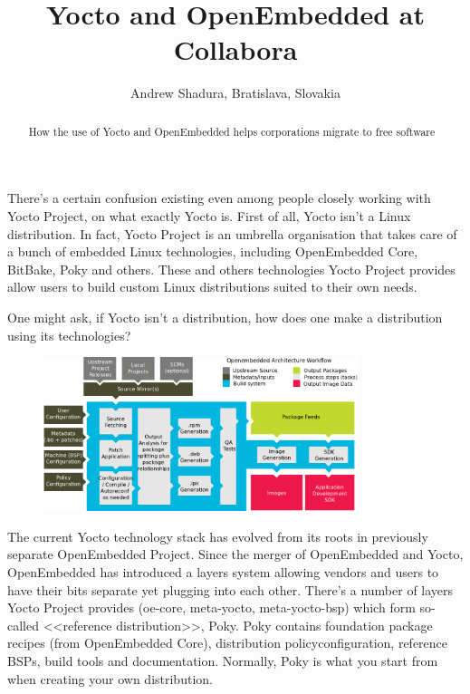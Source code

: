 \documentclass[10pt, a5paper]{article}
\begin{document}
\title{Yocto and OpenEmbedded at Collabora}
\author{Andrew Shadura, Bratislava, Slovakia}
\maketitle
\begin{abstract}
How the use of Yocto and OpenEmbedded helps corporations migrate to free software
\end{abstract}

There's a certain confusion existing even among people closely \linebreak working with Yocto Project, on what exactly Yocto is. First of all, Yocto isn't a Linux distribution. In fact, Yocto Project is an umbrella organisation that takes care of a bunch of embedded Linux technologies, including OpenEmbedded Core, BitBake, Poky and others. These and others technologies Yocto Project provides allow users to build custom Linux distributions suited to their own needs.

One might ask, if Yocto isn't a distribution, how does one make a distribution using its technologies?

\begin{figure}[h!]
  \centering
  \includegraphics[height=4.5cm]{w_07_2016_Shadura1.png}
\end{figure}

The current Yocto technology stack has evolved from its roots in previously separate OpenEmbedded Project. Since the merger \linebreak of OpenEmbedded and Yocto, OpenEmbedded has introduced a layers system allowing vendors and users to have their bits separate yet \linebreak plugging into each other. There's a number of layers Yocto Project provides ({\ttfamily oe-core, meta-yocto, meta-yocto-bsp}) which form so-called \linebreak <<reference distribution>>, Poky. Poky contains foundation package \linebreak recipes (from OpenEmbedded Core), distribution policy\linebreak configuration, reference BSPs, build tools and documentation. Normally, Poky is what you start from when creating your own distribution.
\end{document}
